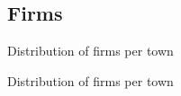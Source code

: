 \documentclass[12pt]{beamer}
\begin{document}
\subsection{Firms}


\begin{frame}{\textcolor{bscuro}{Distribution of firms per town}}
	\begin{figure}[!ht] 
		\centering
	\end{figure}
\end{frame}


\begin{frame}{\textcolor{bscuro}{Distribution of firms per town}}
\begin{figure}[!ht] 
	\centering
\end{figure}
\end{frame}
\end{document}
